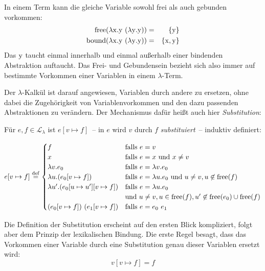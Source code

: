 In einem Term kann die gleiche Variable sowohl frei als auch gebunden
vorkommen:
%
\begin{eqnarray*}
  \operatorname{free}(\lambda \mathrm x.\mathrm y~(\lambda \mathrm y.\mathrm y)) &=& \{ \mathrm y\} \\
  \operatorname{bound}(\lambda \mathrm x.\mathrm y~(\lambda \mathrm y.\mathrm y)) &=& \{ \mathrm x,
                                                            \mathrm y\}
\end{eqnarray*}
%
Das $\mathrm y$ taucht einmal innerhalb und einmal außerhalb einer bindenden
Abstraktion auftaucht. Das Frei- und Gebundensein bezieht sich also
immer auf bestimmte Vorkommen einer Variablen in
einem $\lambda$-Term.

Der $\lambda$-Kalkül ist darauf
angewiesen, Variablen durch andere zu ersetzen, ohne dabei die
Zugehörigkeit von Variablenvorkommen und den dazu passenden
Abstraktionen zu verändern.  Der Mechanismus dafür heißt auch hier
\textit{Substitution}:
%
\begin{definition}[Substitution]
  Für $e,f\in \mathcal{L}_{\lambda}$ ist $e[v\mapsto f]$~-- in $e$ wird $v$ durch $f$
  \textit{substituiert}~-- induktiv definiert:

  \begin{displaymath}
    e[v\mapsto f] \stackrel{\rm def}{=}
    \begin{cases}
      f & \text{falls } e = v\\
      x & \text{falls } e = x \text{ und } x \neq v\\
      \lambda v.e_0 & \text{falls } e = \lambda v.e_0\\
      \lambda u.(e_0[v\mapsto f]) & \text{falls } e = \lambda u.e_0 \text{
        und } u\neq v, u\not\in\operatorname{free}(f)\\
      \lambda u'.(e_0[u\mapsto u'][v\mapsto f]) & \text{falls }
      e = \lambda u.e_0 \\ & \text{und }
      u \neq v,u\in\operatorname{free}(f), u'\not\in\operatorname{free}(e_0)\cup\operatorname{free}(f)\\
      (e_0[v\mapsto f])~(e_1[v\mapsto f]) &
      \text{falls } e = e_0~e_1
    \end{cases}
  \end{displaymath}
  \end{definition}
%
Die Definition der Substitution erscheint auf den ersten Blick
kompliziert, folgt aber dem Prinzip der
lexikalischen Bindung.  Die erste Regel besagt, dass das Vorkommen
einer Variable durch eine Substitution genau dieser Variablen ersetzt
wird:
%
\begin{displaymath}
      v[v\mapsto f] = f
\end{displaymath}
